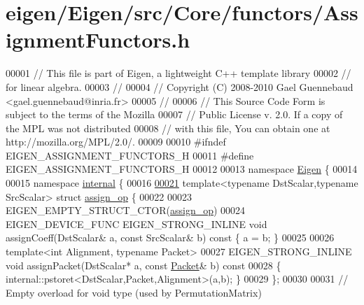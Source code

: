 \hypertarget{eigen_2_eigen_2src_2_core_2functors_2_assignment_functors_8h_source}{}\section{eigen/\+Eigen/src/\+Core/functors/\+Assignment\+Functors.h}
\label{eigen_2_eigen_2src_2_core_2functors_2_assignment_functors_8h_source}

\begin{DoxyCode}
00001 \textcolor{comment}{// This file is part of Eigen, a lightweight C++ template library}
00002 \textcolor{comment}{// for linear algebra.}
00003 \textcolor{comment}{//}
00004 \textcolor{comment}{// Copyright (C) 2008-2010 Gael Guennebaud <gael.guennebaud@inria.fr>}
00005 \textcolor{comment}{//}
00006 \textcolor{comment}{// This Source Code Form is subject to the terms of the Mozilla}
00007 \textcolor{comment}{// Public License v. 2.0. If a copy of the MPL was not distributed}
00008 \textcolor{comment}{// with this file, You can obtain one at http://mozilla.org/MPL/2.0/.}
00009 
00010 \textcolor{preprocessor}{#ifndef EIGEN\_ASSIGNMENT\_FUNCTORS\_H}
00011 \textcolor{preprocessor}{#define EIGEN\_ASSIGNMENT\_FUNCTORS\_H}
00012 
00013 \textcolor{keyword}{namespace }\hyperlink{namespace_eigen}{Eigen} \{
00014 
00015 \textcolor{keyword}{namespace }\hyperlink{namespaceinternal}{internal} \{
00016   
\hyperlink{struct_eigen_1_1internal_1_1assign__op}{00021} \textcolor{keyword}{template}<\textcolor{keyword}{typename} DstScalar,\textcolor{keyword}{typename} SrcScalar> \textcolor{keyword}{struct }\hyperlink{struct_eigen_1_1internal_1_1assign__op}{assign\_op} \{
00022 
00023   EIGEN\_EMPTY\_STRUCT\_CTOR(\hyperlink{struct_eigen_1_1internal_1_1assign__op}{assign\_op})
00024   EIGEN\_DEVICE\_FUNC EIGEN\_STRONG\_INLINE \textcolor{keywordtype}{void} assignCoeff(DstScalar& a, \textcolor{keyword}{const} SrcScalar& b)\textcolor{keyword}{ const }\{ a = b; \}
00025   
00026   \textcolor{keyword}{template}<\textcolor{keywordtype}{int} Alignment, \textcolor{keyword}{typename} Packet>
00027   EIGEN\_STRONG\_INLINE \textcolor{keywordtype}{void} assignPacket(DstScalar* a, \textcolor{keyword}{const} \hyperlink{union_eigen_1_1internal_1_1_packet}{Packet}& b)\textcolor{keyword}{ const}
00028 \textcolor{keyword}{  }\{ internal::pstoret<DstScalar,Packet,Alignment>(a,b); \}
00029 \};
00030 
00031 \textcolor{comment}{// Empty overload for void type (used by PermutationMatrix)}

\end{DoxyCode}
